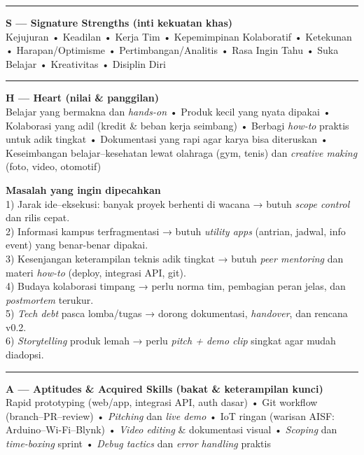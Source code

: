 \documentclass[
  letterpaper,
  DIV=11,
  numbers=noendperiod]{scrreprt}
\begin{document}
\begin{center}\rule{0.5\linewidth}{0.5pt}\end{center}

\textbf{S --- Signature Strengths (inti kekuatan khas)}\\
Kejujuran • Keadilan • Kerja Tim • Kepemimpinan Kolaboratif • Ketekunan
• Harapan/Optimisme • Pertimbangan/Analitis • Rasa Ingin Tahu • Suka
Belajar • Kreativitas • Disiplin Diri

\begin{center}\rule{0.5\linewidth}{0.5pt}\end{center}

\textbf{H --- Heart (nilai \& panggilan)}\\
Belajar yang bermakna dan \emph{hands-on} • Produk kecil yang nyata
dipakai • Kolaborasi yang adil (kredit \& beban kerja seimbang) •
Berbagi \emph{how-to} praktis untuk adik tingkat • Dokumentasi yang rapi
agar karya bisa diteruskan • Keseimbangan belajar--kesehatan lewat
olahraga (gym, tenis) dan \emph{creative making} (foto, video, otomotif)

\textbf{Masalah yang ingin dipecahkan}\\
1) Jarak ide--eksekusi: banyak proyek berhenti di wacana → butuh
\emph{scope control} dan rilis cepat.\\
2) Informasi kampus terfragmentasi → butuh \emph{utility apps} (antrian,
jadwal, info event) yang benar-benar dipakai.\\
3) Kesenjangan keterampilan teknis adik tingkat → butuh \emph{peer
mentoring} dan materi \emph{how-to} (deploy, integrasi API, git).\\
4) Budaya kolaborasi timpang → perlu norma tim, pembagian peran jelas,
dan \emph{postmortem} terukur.\\
5) \emph{Tech debt} pasca lomba/tugas → dorong dokumentasi,
\emph{handover}, dan rencana v0.2.\\
6) \emph{Storytelling} produk lemah → perlu \emph{pitch + demo clip}
singkat agar mudah diadopsi.

\begin{center}\rule{0.5\linewidth}{0.5pt}\end{center}

\textbf{A --- Aptitudes \& Acquired Skills (bakat \& keterampilan
kunci)}\\
Rapid prototyping (web/app, integrasi API, auth dasar) • Git workflow
(branch--PR--review) • \emph{Pitching} dan \emph{live demo} • IoT ringan
(warisan AISF: Arduino--Wi-Fi--Blynk) • \emph{Video editing} \&
dokumentasi visual • \emph{Scoping} dan \emph{time-boxing} sprint •
\emph{Debug tactics} dan \emph{error handling} praktis
\end{document}
